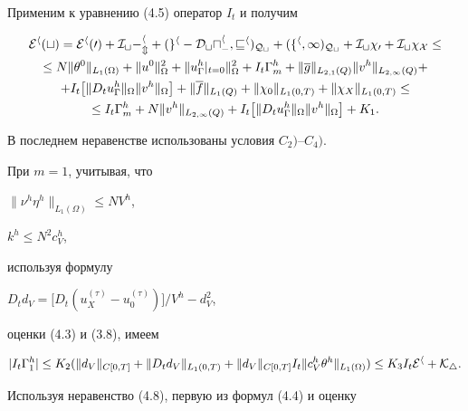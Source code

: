 \documentclass[12pt]{article}
\theoremstyle{plain} %
\theoremstyle{definition}
\numberwithin{equation}{section}
\begin{document}
\begin{pf} Применим к уравнению (4.5) оператор $I_t$ и получим


\begin{multline}


\cal E^h(t) = \cal E^h(0) + I_t\Gamma_m^h


+ (g^h - D_tu^h_{\Gamma}, v^h)_{Q_t} +


(f^h,1)_{Q_t}+ I_t\chi_0+I_t\chi_X\le\\


%


\le N\|\theta^0\|_{L_1(\Omega)}+


\|u^0\|^2_\Omega+\|u^h_\Gamma|_{t=0}\|^2_\Omega +


I_t\Gamma_m^h+ \|\overline g\|_{L_{2,1}(Q)}\|v^h\|_{L_{2,\infty}(Q)}+\\


%


+I_t\bigl[\|D_tu^h_{\Gamma}\|_\Omega\|v^h\|_\Omega\bigr]


+\|\overline f\|_{L_1(Q)}+\|\chi_0\|_{L_1(0,T)}+\|\chi_X\|_{L_1(0,T)}\le\\


%


\le I_t\Gamma_m^h+ N\|v^h\|_{L_{2,\infty}(Q)}+


I_t\bigl[\|D_tu^h_{\Gamma}\|_\Omega\|v^h\|_\Omega\bigr]+K_1.


\end{multline}


В последнем неравенстве использованы условия $C_2)$--$C_4)$.





При $m=1$, учитывая, что


$\|\nu^h\eta^h\|_{L_1(\Omega)}\le N V^{h}$,


$k^h\le N^2 c^h_V$,


используя формулу


$D_td_V=\bigl[D_t(u_X^{(\tau)}-u_0^{(\tau)})\bigr]/V^h - d_V^2$,


оценки (4.3) и (3.8), имеем


$$


|I_t\Gamma^h_1|


\le K_2(\|d_V\|_{C[0,T]}+\|D_td_V\|_{L_1(0,T)} +


\|d_V\|_{C[0,T]} I_t\| c^h_V\theta^h\|_{L_1(\Omega)})\le


K_3 I_t\cal E^h+K_4.


$$


Используя неравенство (4.8), первую из формул (4.4) и оценку



\end{pf}
\end{document}
